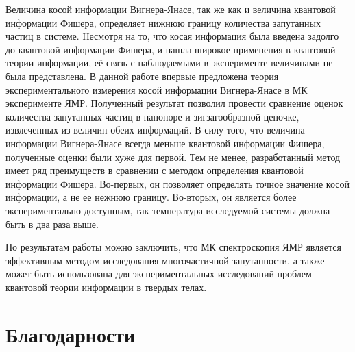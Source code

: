 Величина косой информации Вигнера-Янасе,
так же как и величина квантовой информации Фишера,
определяет нижнюю границу количества запутанных частиц в системе.
Несмотря на то, что косая информация была введена задолго до квантовой информации Фишера,
и нашла широкое применения в квантовой теории информации,
её связь с наблюдаемыми в эксперименте величинами не была представлена.
В данной работе впервые предложена теория экспериментального измерения косой информации Вигнера-Янасе
в МК эксперименте ЯМР.
Полученный результат позволил провести сравнение оценок количества запутанных частиц в нанопоре и зигзагообразной цепочке,
извлеченных из величин обеих информаций.
В силу того, что величина информации Вигнера-Янасе всегда меньше квантовой информации Фишера,
полученные оценки были хуже для первой.
Тем не менее, разработанный метод имеет ряд преимуществ в сравнении с методом определения квантовой информации Фишера.
Во-первых, он позволяет определять точное значение косой информации, а не ее нежнюю границу.
Во-вторых, он является более экспериментально доступным, так температура исследуемой системы должна быть в два раза выше.


По результатам работы можно заключить,
что МК спектроскопия ЯМР является эффективным методом исследования многочастичной запутанности,
а также может быть использована для экспериментальных исследований проблем квантовой теории информации в твердых телах.

\chapter*{Благодарности}


